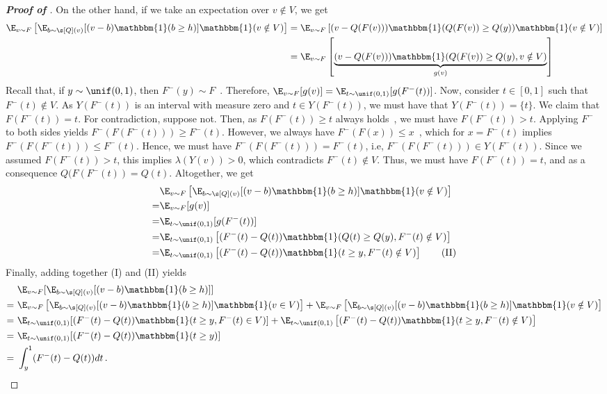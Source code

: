 \begin{proof}[\textbf{Proof of }]
	On the other hand, if we take an expectation over $v \notin V$, we get 
	\begin{align*}
		\E_{v \sim F}\left[ \E_{b \sim \s[Q](v)} [(v - b) \mathbbm{1}(b \geq h)] \mathbbm{1}(v \notin V) \right] &= \E_{v \sim F}\left[(v - Q(F(v))) \mathbbm{1}(Q(F(v)) \geq Q(y)) \mathbbm{1}(v \notin V) \right]\\
			&= \E_{v \sim F}\left[\underbrace{(v - Q(F(v))) \mathbbm{1}(Q(F(v)) \geq Q(y), v \notin V)}_{g(v)} \right]
	\end{align*}
	Recall that, if $y \sim \unif(0,1)$, then $F^-(y) \sim F$~\citep{embrechts2013note}. Therefore, $\E_{v \sim F}[g(v)] = \E_{t \sim \unif(0,1)}[g(F^-(t))]$. Now, consider $t \in [0,1]$ such that $F^-(t) \notin V$. As $Y(F^-(t))$ is an interval with measure zero and $t \in Y(F^-(t))$, we must have that $Y(F^-(t)) = \{t\}$. We claim that $F(F^-(t)) = t$. For contradiction, suppose not. Then, as $F(F^-(t)) \geq t$ always holds~\citet{embrechts2013note}, we must have $F(F^-(t)) > t$. Applying $F^-$ to both sides yields $F^-(F(F^-(t))) \geq F^-(t)$. However, we always have $F^-(F(x)) \leq x$~\citep{embrechts2013note}, which for $x = F^-(t)$ implies $F^-(F(F^-(t))) \leq F^-(t)$. Hence, we must have $F^-(F(F^-(t))) = F^-(t)$, i.e, $F^-(F(F^-(t))) \in Y(F^-(t))$. Since we assumed $F(F^-(t)) > t$, this implies $\lambda(Y(v)) > 0$, which contradicts $F^-(t) \notin V$. Thus, we must have $F(F^-(t)) = t$, and as a consequence $Q(F(F^-(t)) = Q(t)$. Altogether, we get
	\begin{align*}
		&\E_{v \sim F}\left[ \E_{b \sim \s[Q](v)} [(v - b) \mathbbm{1}(b \geq h)] \mathbbm{1}(v \notin V) \right]\\ = &\E_{v \sim F}[g(v)]\\
		= &\E_{t \sim \unif(0,1)}[g(F^-(t))]\\
		= &\E_{t \sim \unif(0,1)}\left[(F^-(t) - Q(t)) \mathbbm{1}(Q(t) \geq Q(y), F^-(t) \notin V) \right]\\
		= &\E_{t \sim \unif(0,1)}\left[(F^-(t) - Q(t)) \mathbbm{1}(t \geq y, F^-(t) \notin V) \right] \tag{II}
	\end{align*} 
	Finally, adding together (I) and (II) yields
	\begin{align*}
		& \E_{v \sim F}[ \E_{b \sim \s[Q](v)} [(v - b) \mathbbm{1}(b \geq h)]]\\
		=\ &\E_{v \sim F}\left[ \E_{b \sim \s[Q](v)} [(v - b) \mathbbm{1}(b \geq h)] \mathbbm{1}(v \in V) \right] + \E_{v \sim F}\left[ \E_{b \sim \s[Q](v)} [(v - b) \mathbbm{1}(b \geq h)] \mathbbm{1}(v \notin V) \right]\\
		=\ &\E_{t \sim \unif(0,1)}[(F^-(t) - Q(t))\mathbbm{1}(t \geq y,  F^-(t) \in V)] + \E_{t \sim \unif(0,1)}\left[(F^-(t) - Q(t)) \mathbbm{1}(t \geq y, F^-(t) \notin V) \right]\\
		=\ &\E_{t \sim \unif(0,1)}[(F^-(t) - Q(t))\mathbbm{1}(t \geq y)]\\
		=\ &\int_y^1 (F^-(t) - Q(t))dt\,.
	\end{align*}


\end{proof}
